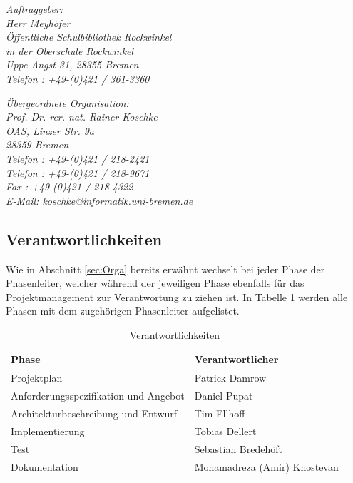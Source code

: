 \documentclass[fontsize=12pt,paper=a4,twoside]{scrartcl}
\begin{document}
{\em Auftraggeber:\\
	Herr Meyhöfer\\
	Öffentliche Schulbibliothek Rockwinkel\\
	in der Oberschule Rockwinkel\\
	Uppe Angst 31, 28355 Bremen\\
	Telefon : +49-(0)421 / 361-3360\\
}

{\em Übergeordnete Organisation:\\ 
	Prof. Dr. rer. nat. Rainer Koschke\\
	OAS, Linzer Str. 9a\\
	28359 Bremen\\
	Telefon : +49-(0)421 / 218-2421\\
	Telefon : +49-(0)421 / 218-9671\\
	Fax : +49-(0)421 / 218-4322\\
	E-Mail: koschke@informatik.uni-bremen.de
}


\subsection{Verantwortlichkeiten}
\label{sec:verantwortlichkeiten}

Wie in Abschnitt \ref{sec:Orga} bereits erwähnt wechselt bei jeder Phase der Phasenleiter, welcher während der jeweiligen Phase ebenfalls für das Projektmanagement zur Verantwortung zu ziehen ist. In Tabelle \ref{tab:respons} werden alle Phasen mit dem zugehörigen Phasenleiter aufgelistet.

\begin{table}[htbp]
\caption{Verantwortlichkeiten}
\label{tab:respons}
\centering
\begin{tabular}{p{}|p{}}
\hline Phase & Verantwortlicher \\ \hline
\hline Projektplan & Patrick Damrow\\
\hline Anforderungsspezifikation und Angebot & Daniel Pupat\\
\hline Architekturbeschreibung und Entwurf & Tim Ellhoff\\
\hline Implementierung & Tobias Dellert\\
\hline Test & Sebastian Bredehöft\\
\hline Dokumentation & Mohamadreza (Amir) Khostevan\\
\hline 
\end{tabular}
\end{table}
\end{document}
